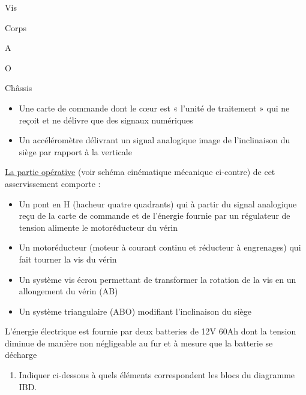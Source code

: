 Vis

Corps

A

O

Châssis

\begin{itemize}
\item
  Une carte de commande dont le cœur est « l'unité de traitement » qui
  ne reçoit et ne délivre que des signaux numériques
\item
  Un accéléromètre délivrant un signal analogique image de l'inclinaison
  du siège par rapport à la verticale
\end{itemize}

\ul{La partie opérative} (voir schéma cinématique mécanique ci-contre)
de cet asservissement comporte :

\begin{itemize}
\item
  Un pont en H (hacheur quatre quadrants) qui à partir du signal
  analogique reçu de la carte de commande et de l'énergie fournie par un
  régulateur de tension alimente le motoréducteur du vérin
\item
  Un motoréducteur (moteur à courant continu et réducteur à engrenages)
  qui fait tourner la vis du vérin
\item
  Un système vis écrou permettant de transformer la rotation de la vis
  en un allongement du vérin (AB)
\item
  Un système triangulaire (ABO) modifiant l'inclinaison du siège
\end{itemize}

L'énergie électrique est fournie par deux batteries de 12V 60Ah dont la
tension diminue de manière non négligeable au fur et à mesure que la
batterie se décharge

\begin{enumerate}
\def\labelenumi{\arabic{enumi}.}
\item
  Indiquer ci-dessous à quels éléments correspondent les blocs du
  diagramme IBD.
\end{enumerate}

